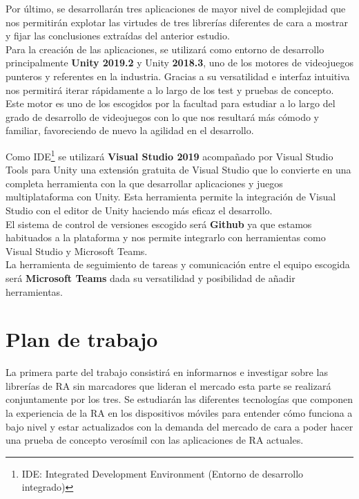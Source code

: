 Por último, se desarrollarán tres aplicaciones de mayor nivel de complejidad que nos permitirán explotar las virtudes de tres librerías diferentes de cara a mostrar y fijar las conclusiones extraídas del anterior estudio.\\


Para la creación de las aplicaciones, se utilizará como entorno de desarrollo principalmente \textbf{Unity 2019.2} y Unity\textbf{ 2018.3}, uno de los motores de videojuegos punteros y referentes en la industria. Gracias a su versatilidad e interfaz intuitiva nos permitirá iterar rápidamente a lo largo de los test y pruebas de concepto. Este motor es uno de los escogidos por la facultad para estudiar a lo largo del grado de desarrollo de videojuegos con lo que nos resultará más cómodo y familiar, favoreciendo de nuevo la agilidad en el desarrollo.\vspace{\baselineskip}

Como IDE\footnote{IDE: Integrated Development Environment (Entorno de desarrollo integrado)}  se utilizará \textbf{Visual Studio 2019} acompañado por Visual Studio Tools para Unity una extensión gratuita de Visual Studio que lo convierte en una completa herramienta con la que desarrollar aplicaciones y juegos multiplataforma con Unity. Esta herramienta permite la integración de Visual Studio con el editor de Unity haciendo más eficaz el desarrollo.\\

El sistema de control de versiones escogido será \textbf{Github} ya que estamos habituados a la plataforma y nos permite integrarlo con herramientas como Visual Studio y Microsoft Teams.\\

La herramienta de seguimiento de tareas y comunicación entre el equipo escogida será \textbf{Microsoft Teams} dada su versatilidad y posibilidad de añadir herramientas.\\

\section{Plan de trabajo}
La primera parte del trabajo consistirá en informarnos e investigar sobre las librerías de RA sin marcadores que lideran el mercado esta parte se realizará conjuntamente por los tres. Se estudiarán las diferentes tecnologías que componen la experiencia de la RA en los dispositivos móviles para entender cómo funciona a bajo nivel y estar actualizados con la demanda del mercado de cara a poder hacer una prueba de concepto verosímil con las aplicaciones de RA actuales. \vspace{\baselineskip}

